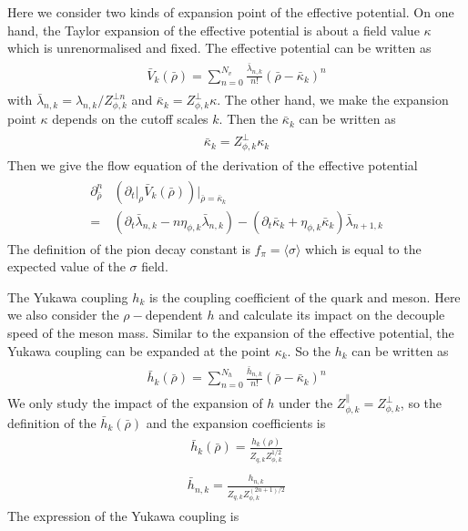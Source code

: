 \documentclass[%
reprint,
superscriptaddress,
showpacs,preprintnumbers,
 amsmath,amssymb,
 aps,
prd,
]{revtex4-1}
\begin{document}
Here we consider two kinds of expansion point of the effective potential. On one hand, the Taylor expansion of the effective 
potential is about a field value $\kappa$ which is unrenormalised and fixed. The effective potential can be written as
\begin{align}\label{}
\begin{split}
\bar{V}_k(\bar{\rho})=\sum^{N_v}_{n=0}\frac{\bar{\lambda}_{n,k}}{n!}(\bar{\rho}-\bar{\kappa}_k)^n
\end{split}
\end{align}
with $\bar{\lambda}_{n,k}=\lambda_{n,k}/Z^{\bot n}_{\phi,k}$ and $\bar{\kappa}_k=Z^{\bot}_{\phi,k}\kappa$.
The other hand, we make the expansion point $\kappa$ depends on the cutoff scales $k$. Then the $\bar{\kappa}_k$ 
can be written as
\begin{align}\label{}
\begin{split}
\bar{\kappa}_k=Z^{\bot}_{\phi,k}\kappa_k
\end{split}
\end{align} 
Then we give the flow equation of the derivation of the effective potential
\begin{align}\label{}
\begin{split}
\partial^{n}_{\bar{\rho}}&(\partial_t\big|_{\rho}\bar{V}_k(\bar{\rho}))\bigg|_{\bar{\rho}=\bar{\kappa}_k}\\
=&(\partial_t\bar{\lambda}_{n,k}-n\eta_{\phi,k}\bar{\lambda}_{n,k})-(\partial_t\bar{\kappa}_k+\eta_{\phi,k}\bar{\kappa}_k)\bar{\lambda}_{n+1,k}
\end{split}
\end{align} 
The definition of the pion decay constant is $f_\pi=\langle\sigma\rangle$
which is equal to the expected value of the $\sigma$ field.\par
The Yukawa coupling $h_k$ is the coupling coefficient of the quark and meson. Here we also consider the $\rho-$dependent $h$ and calculate its
impact on the decouple speed of the meson mass. Similar to the expansion of the effective potential, the Yukawa coupling can be expanded at the point
$\kappa_k$. So the $h_k$ can be written as
\begin{align}\label{}
\begin{split}
\bar{h}_k(\bar{\rho})=\sum^{N_h}_{n=0}\frac{\bar{h}_{n,k}}{n!}(\bar{\rho}-\bar{\kappa}_k)^n
\end{split}
\end{align}
We only study the impact of the expansion of $h$ under the $Z^{\|}_{\phi,k}=Z^{\bot}_{\phi,k}$, so the definition of the $\bar{h}_k(\bar{\rho})$ and the expansion
coefficients is
\begin{align}\label{}
\begin{split}
\bar{h}_k(\bar{\rho})=\frac{h_k(\rho)}{Z_{q,k}Z^{1/2}_{\phi,k}}
\end{split}
\end{align}
\begin{align}\label{}
\begin{split}
\bar{h}_{n,k}=\frac{h_{n,k}}{Z_{q,k}Z^{(2n+1)/2}_{\phi,k}}
\end{split}
\end{align}
The expression of the Yukawa coupling is
\end{document}
